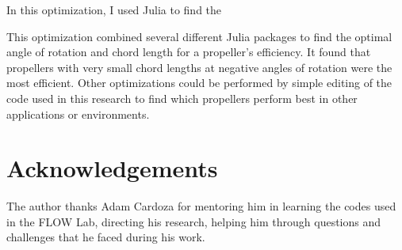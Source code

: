 \documentclass[journal ]{new-aiaa}
\begin{document}
In this optimization, I used Julia to find the 




















This optimization combined several different Julia packages to find the optimal angle of rotation and chord length for a propeller's efficiency. It found that propellers with very small chord lengths at negative angles of rotation were the most efficient. Other optimizations could be performed by simple editing of the code used in this research to find which propellers perform best in other applications or environments. 


\section{Acknowledgements}

The author thanks Adam Cardoza for mentoring him in learning the codes used in the FLOW Lab, directing his research, helping him through questions and challenges that he faced during his work.




\end{document}
